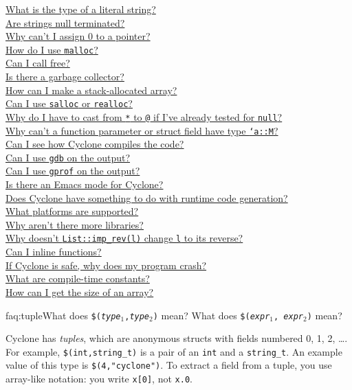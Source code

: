 \begin{small}
\hyperlink{faq:litstring}{What is the type of a literal string?}\\
\hyperlink{faq:nullterminate}{Are strings null terminated?}\\
\hyperlink{faq:zero}{Why can't I assign 0 to a pointer?}\\
\hyperlink{faq:malloc}{How do I use \texttt{malloc}?}\\
\hyperlink{faq:free}{Can I call free?}\\
\hyperlink{faq:gc}{Is there a garbage collector?}\\
\hyperlink{faq:stackalloc}{How can I make a stack-allocated array?}\\
\hyperlink{faq:realloc}{Can I use \texttt{salloc} or \texttt{realloc}?}\\
\hyperlink{faq:nullcast}{Why do I have to cast from \texttt{*} to \texttt{@} if I've already tested for \texttt{null}?}\\
\hyperlink{faq:memkind}{Why can't a function parameter or struct field have type \texttt{`a::M}?}\\
\hyperlink{faq:compile}{Can I see how Cyclone compiles the code?}\\
\hyperlink{faq:gdb}{Can I use \texttt{gdb} on the output?}\\
\hyperlink{faq:gprof}{Can I use \texttt{gprof} on the output?}\\
\hyperlink{faq:emacs}{Is there an Emacs mode for Cyclone?}\\
\hyperlink{faq:rtcg}{Does Cyclone have something to do with runtime code generation?}\\
\hyperlink{faq:platforms}{What platforms are supported?}\\
\hyperlink{faq:libs}{Why aren't there more libraries?}\\
\hyperlink{faq:imprev}{Why doesn't \texttt{List::imp_rev(l)} change \texttt{l} to its reverse?}\\
\hyperlink{faq:inline}{Can I inline functions?}\\
\hyperlink{faq:crash}{If Cyclone is safe, why does my program crash?}\\
\hyperlink{faq:ctc}{What are compile-time constants?}\\
\hyperlink{faq:arraysize}{How can I get the size of an array?}
\end{small}
\fi

\begin{faqa}{faq:tuple}{What does \texttt{\$({\it type}$_1$,{\it type}$_2$)} mean?  What does \texttt{\$({\it expr}$_1$, {\it expr}$_2$)} mean?}

Cyclone has \emph{tuples}, which are anonymous structs with fields
numbered 0, 1, 2, \ldots.  For example, \texttt{\$(int,string_t)} is a
pair of an \texttt{int} and a \texttt{string_t}.  An example value of
this type is \texttt{\$(4,"cyclone")}.  To extract a field from a
tuple, you use array-like notation: you write \texttt{x[0]}, not
\texttt{x.0}.
\end{faqa}

